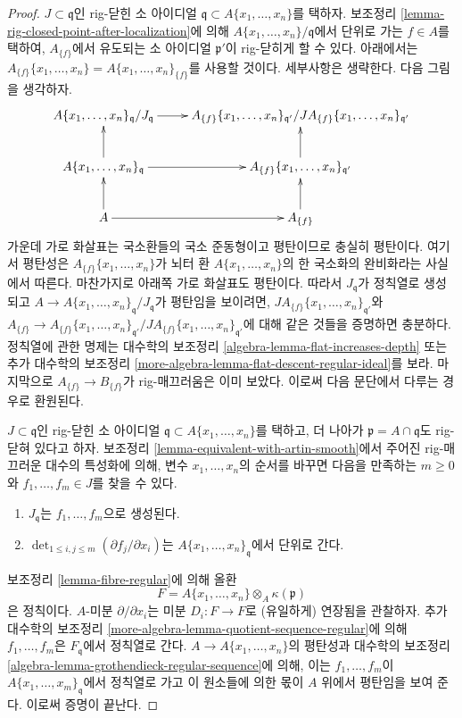 \begin{proof}
\medskip\noindent
$J \subset \mathfrak q$인 rig-닫힌 소 아이디얼
$\mathfrak q \subset A\{x_1, \ldots, x_n\}$를 택하자.
보조정리 \ref{lemma-rig-closed-point-after-localization}에 의해
$A\{x_1, \ldots, x_n\}/\mathfrak q$에서 단위로 가는 $f \in A$를 택하여,
$A_{\{f\}}$에서 유도되는 소 아이디얼 $\mathfrak p'$이 rig-닫히게 할 수 있다.
아래에서는
$A_{\{f\}}\{x_1, \ldots, x_n\} = A\{x_1, \ldots, x_n\}_{\{f\}}$를
사용할 것이다. 세부사항은 생략한다. 다음 그림을 생각하자.
$$
\xymatrix{
A\{x_1, \ldots, x_n\}_{\mathfrak q} / J_\mathfrak q \ar[r] &
A_{\{f\}}\{x_1, \ldots, x_n\}_{\mathfrak q'}/
J A_{\{f\}}\{x_1, \ldots, x_n\}_{\mathfrak q'} \\
A\{x_1, \ldots, x_n\}_{\mathfrak q} \ar[r] \ar[u] &
A_{\{f\}}\{x_1, \ldots, x_n\}_{\mathfrak q'} \ar[u] \\
A \ar[r] \ar[u] &
A_{\{f\}} \ar[u]
}
$$
가운데 가로 화살표는 국소환들의 국소 준동형이고 평탄이므로 충실히 평탄이다.
여기서 평탄성은 $A_{\{f\}}\{x_1, \ldots, x_n\}$가 뇌터 환
$A\{x_1, \ldots, x_n\}$의 한 국소화의 완비화라는 사실에서 따른다.
마찬가지로 아래쪽 가로 화살표도 평탄이다. 따라서
$J_\mathfrak q$가 정칙열로 생성되고
$A \to A\{x_1, \ldots, x_n\}_{\mathfrak q} / J_\mathfrak q$가
평탄임을 보이려면,
$J A_{\{f\}}\{x_1, \ldots, x_n\}_{\mathfrak q'}$와
$A_{\{f\}} \to A_{\{f\}}\{x_1, \ldots, x_n\}_{\mathfrak q'}/
J A_{\{f\}}\{x_1, \ldots, x_n\}_{\mathfrak q'}$에 대해
같은 것들을 증명하면 충분하다. 정칙열에 관한 명제는 대수학의 보조정리
\ref{algebra-lemma-flat-increases-depth} 또는 추가 대수학의 보조정리
\ref{more-algebra-lemma-flat-descent-regular-ideal}를 보라.
마지막으로 $A_{\{f\}} \to B_{\{f\}}$가 rig-매끄러움은 이미 보았다.
이로써 다음 문단에서 다루는 경우로 환원된다.

\medskip\noindent
$J \subset \mathfrak q$인 rig-닫힌 소 아이디얼
$\mathfrak q \subset A\{x_1, \ldots, x_n\}$를 택하고, 더 나아가
$\mathfrak p = A \cap \mathfrak q$도 rig-닫혀 있다고 하자.
보조정리 \ref{lemma-equivalent-with-artin-smooth}에서 주어진
rig-매끄러운 대수의 특성화에 의해, 변수 $x_1, \ldots, x_n$의 순서를 바꾸면
다음을 만족하는 $m \geq 0$와 $f_1, \ldots, f_m \in J$를 찾을 수 있다.
\begin{enumerate}
\item $J_\mathfrak q$는 $f_1, \ldots, f_m$으로 생성된다.
\item $\det_{1 \leq i, j \leq m}(\partial f_j/ \partial x_i)$는
$A\{x_1, \ldots, x_n\}_\mathfrak q$에서 단위로 간다.
\end{enumerate}
보조정리 \ref{lemma-fibre-regular}에 의해 올환
$$
F = A\{x_1, \ldots, x_n\} \otimes_A \kappa(\mathfrak p)
$$
은 정칙이다. $A$-미분 $\partial / \partial x_i$는
미분 $D_i : F \to F$로 (유일하게) 연장됨을 관찰하자.
추가 대수학의 보조정리
\ref{more-algebra-lemma-quotient-sequence-regular}에 의해
$f_1, \ldots, f_m$은 $F_\mathfrak q$에서 정칙열로 간다.
$A \to A\{x_1, \ldots, x_n\}$의 평탄성과 대수학의 보조정리
\ref{algebra-lemma-grothendieck-regular-sequence}에 의해,
이는 $f_1, \ldots, f_m$이
$A\{x_1, \ldots, x_m\}_\mathfrak q$에서 정칙열로 가고 이 원소들에
의한 몫이 $A$ 위에서 평탄임을 보여 준다.
이로써 증명이 끝난다.
\end{proof}

